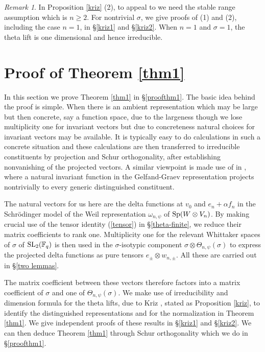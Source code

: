 \documentclass[12pt]{amsart}
\theoremstyle{definition}
\theoremstyle{remark}
\newtheorem{remark}{Remark}
\begin{document}
\begin{remark}
In Proposition \ref{kriz} (2), to appeal to \cite{kri24,kri25} we need the stable range assumption which is $n \geq 2$. For nontrivial $\sigma$, we give proofs of (1) and (2), including the case $n=1$, in §\ref{kriz1} and \S \ref{kriz2}. When $n=1$ and $\sigma=1$, the theta lift is one dimensional and hence irreducible.
\end{remark}

\section{Proof of Theorem \ref{thm1}}\label{proof-thm1}

In this section we prove Theorem \ref{thm1} in \S \ref{proofthm1}. The basic idea behind the proof is simple. When there is an ambient representation which may be large but then concrete, say a function space, due to the largeness though we lose multiplicity one for invariant vectors but due to concreteness natural choices for invariant vectors may be available. It is typically easy to do calculations in such a concrete situation and these calculations are then transferred to irreducible constituents by projection and Schur orthogonality, after establishing nonvanishing of the projected vectors. A similar viewpoint is made use of in \cite[Corollary 1.2 and Remark 9]{am20}, where a natural invariant function in the Gelfand-Graev representation projects nontrivially to every generic distinguished constituent. 

The natural vectors for us here are the delta functions at $v_0$ and $e_n+\alpha f_n$ in the
Schr\"odinger model of the Weil representation $\omega_{n,\psi}$ of ${\rm Sp}(W \otimes V_n)$. By
making crucial use of the tensor identity (\ref{tensor}) in \S \ref{theta-finite}, we reduce their matrix
coefficients to rank one. Multiplicity one for the relevant Whittaker spaces of $\sigma$ of 
${\rm SL}_2(\mathbb F_q)$ is then used in the $\sigma$-isotypic 
component $\sigma\otimes\Theta_{n,\psi}(\sigma)$ to express the projected delta functions as pure tensors $e_\pm\otimes w_{n,\pm}$. All these are carried out in \S \ref{two lemmas}.

The matrix coefficient between these vectors therefore factors into a matrix coefficient of $\sigma$ and one of $\Theta_{n,\psi}(\sigma)$. We make use of irreducibility and dimension formula for the theta lifts, due to Kriz \cite{kri24,kri25}, stated as Proposition \ref{kriz}, to identify the distinguished representations and for the normalization in Theorem \ref{thm1}. We give independent proofs of these results in \S \ref{kriz1} and \S \ref{kriz2}. We can then deduce Theorem \ref{thm1} through Schur orthogonality which we do in \S \ref{proofthm1}.
\end{document}
